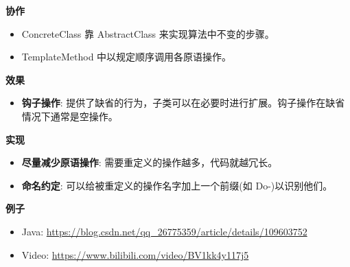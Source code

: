 \noindent\textbf{协作}

\begin{itemize}
    \item ConcreteClass 靠 AbstractClass 来实现算法中不变的步骤。
    \item TemplateMethod 中以规定顺序调用各原语操作。
\end{itemize}

\noindent\textbf{效果}

\begin{itemize}
    \item \textbf{钩子操作}: 提供了缺省的行为，子类可以在必要时进行扩展。钩子操作在缺省情况下通常是空操作。
\end{itemize}

\noindent\textbf{实现}

\begin{itemize}
    \item \textbf{尽量减少原语操作}: 需要重定义的操作越多，代码就越冗长。
    \item \textbf{命名约定}: 可以给被重定义的操作名字加上一个前缀(如 Do-)以识别他们。
\end{itemize}

\noindent\textbf{例子}

\begin{itemize}
    \item Java: \url{https://blog.csdn.net/qq_26775359/article/details/109603752}
    \item Video: \url{https://www.bilibili.com/video/BV1kk4y117j5}
\end{itemize}



\newpage